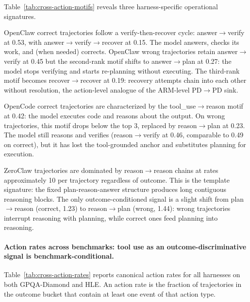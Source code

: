 
Table~\ref{tab:cross-action-motifs} reveals three harness-specific
operational signatures.

OpenClaw correct trajectories follow a verify-then-recover cycle:
answer$\to$verify at 0.53, with answer$\to$verify$\to$recover at 0.15.
The model answers, checks its work, and (when needed) corrects.
OpenClaw wrong trajectories retain answer$\to$verify at 0.45 but the
second-rank motif shifts to answer$\to$plan at 0.27: the model stops
verifying and starts re-planning without executing.
The third-rank motif becomes recover$\to$recover at 0.19: recovery
attempts chain into each other without resolution, the action-level
analogue of the ARM-level PD$\to$PD sink.

OpenCode correct trajectories are characterized by the tool\_use$\to$reason
motif at 0.42: the model executes code and reasons about the output.
On wrong trajectories, this motif drops below the top 3, replaced by
reason$\to$plan at 0.23.
The model still reasons and verifies (reason$\to$verify at 0.46, comparable
to 0.49 on correct), but it has lost the tool-grounded anchor and
substitutes planning for execution.

ZeroClaw trajectories are dominated by reason$\to$reason chains at rates
approximately 10 per trajectory regardless of outcome.
This is the template signature: the fixed plan-reason-answer structure
produces long contiguous reasoning blocks.
The only outcome-conditioned signal is a slight shift from plan$\to$reason
(correct, 1.23) to reason$\to$plan (wrong, 1.44): wrong trajectories
interrupt reasoning with planning, while correct ones feed planning into
reasoning.

\paragraph{Action rates across benchmarks: tool use as an
outcome-discriminative signal is benchmark-conditional.}

Table~\ref{tab:cross-action-rates} reports canonical action rates for all
harnesses on both GPQA-Diamond and HLE.
An action rate is the fraction of trajectories in the outcome bucket that
contain at least one event of that action type.

